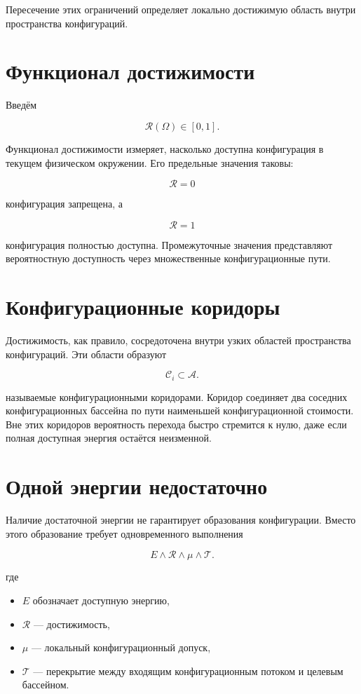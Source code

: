 Пересечение этих ограничений определяет локально достижимую область внутри пространства конфигураций.

\section{Функционал достижимости}

Введём

\[ \boxed{ \mathcal R(\Omega) \in [0,1]. } \]

Функционал достижимости измеряет, насколько доступна конфигурация в текущем физическом окружении. Его предельные значения таковы:

\[ \mathcal R=0 \]

конфигурация запрещена, а

\[ \mathcal R=1 \]

конфигурация полностью доступна. Промежуточные значения представляют вероятностную доступность через множественные конфигурационные пути.

\section{Конфигурационные коридоры}

Достижимость, как правило, сосредоточена внутри узких областей пространства конфигураций. Эти области образуют

\[ \boxed{ \mathcal C_i \subset \mathcal A. } \]

называемые конфигурационными коридорами. Коридор соединяет два соседних конфигурационных бассейна по пути наименьшей конфигурационной стоимости. Вне этих коридоров вероятность перехода быстро стремится к нулю, даже если полная доступная энергия остаётся неизменной.

\section{Одной энергии недостаточно}

Наличие достаточной энергии не гарантирует образования конфигурации. Вместо этого образование требует одновременного выполнения

\[ \boxed{ E \land \mathcal R \land \mu \land \mathcal T. } \]

где

\begin{itemize}
\item $E$ обозначает доступную энергию,
\item $\mathcal R$ — достижимость,
\item $\mu$ — локальный конфигурационный допуск,
\item $\mathcal T$ — перекрытие между входящим конфигурационным потоком
и целевым бассейном.
\end{itemize}

